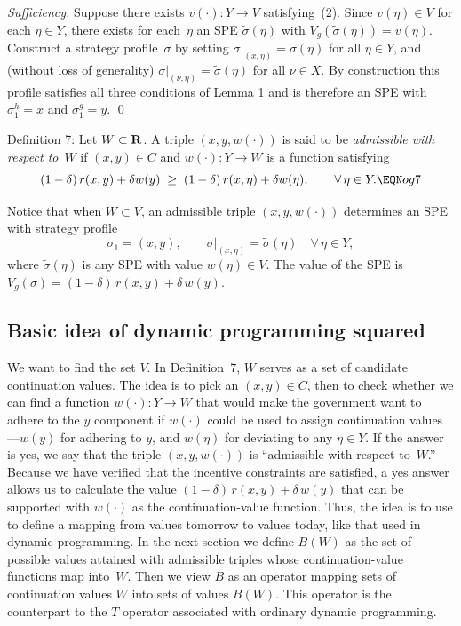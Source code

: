 \smallskip
{\sl Sufficiency.\/}
Suppose there exists $v(\cdot):Y\to V$ satisfying~(2).
Since $v(\eta)\in V$ for each $\eta\in Y$, there exists for each~$\eta$
an SPE $\tilde\sigma(\eta)$ with $V_g(\tilde\sigma(\eta))=v(\eta)$.
Construct a strategy profile~$\sigma$ by setting
$\sigma|_{(x,\eta)}=\tilde\sigma(\eta)$ for all $\eta\in Y$, and
(without loss of generality) $\sigma|_{(\nu,\eta)}=\tilde\sigma(\eta)$
for all $\nu\in X$.  By construction this profile satisfies all three
conditions of  Lemma 1 and is therefore an SPE with
$\sigma^h_1=x$ and $\sigma^g_1=y$.
\qed






\medskip\noindent
{\sc Definition 7:} 
Let $W\subset{\bf R}$.  A triple $(x,y,w(\cdot))$ is said to be
{\it admissible with respect to\/}~$W$ if $(x,y)\in C$ and
$w(\cdot):Y\to W$ is a function satisfying
$$  (1-\delta)\,r(x,y)+\delta w(y)
    \;\geq\;
    (1-\delta)\,r(x,\eta)+\delta w(\eta) ,
    \qquad \forall\,\eta\in Y . \EQN og7 $$


\medskip %
Notice that when $W\subset V$, an admissible triple $(x,y,w(\cdot))$
determines an SPE with strategy profile
$$\sigma_1=(x,y),\qquad \sigma|_{(x,\eta)}=\tilde\sigma(\eta)
  \quad\forall\,\eta\in Y,$$
where $\tilde\sigma(\eta)$ is any SPE with value $w(\eta)\in V$.
The value of the SPE is
$V_g(\sigma)=(1-\delta)\,r(x,y)+\delta\,w(y)$.



\medskip
\subsection{Basic idea of dynamic programming squared}
We want to find the set $V$. In Definition~7, $W$ serves as a
set of candidate continuation values. The idea is to pick an $(x,y)\in
C$, then to check whether we can find a function $w(\cdot):Y\to W$ that
would make the government want to adhere to the $y$ component if
$w(\cdot)$ could be used to assign continuation values---$w(y)$ for
adhering to $y$, and $w(\eta)$ for deviating to any $\eta\in Y$. If the
answer is yes, we say that the triple $(x,y,w(\cdot))$ is ``admissible
with respect to~$W$.'' Because we have verified that the incentive
constraints are satisfied, a yes answer allows us to calculate the value
$
  (1-\delta)\,r(x,y)+\delta\,w(y)
$
that can be supported with $w(\cdot)$ as the continuation-value
function. Thus, the idea is to use   to define a mapping
from values tomorrow to values today, like that used in dynamic
programming. In the next section we define $B(W)$ as the set of possible
values attained with admissible triples whose continuation-value
functions map into~$W$. Then we view $B$ as an operator mapping sets of
continuation values $W$ into sets of values $B(W)$. This operator is the
counterpart to the $T$ operator associated with ordinary dynamic
programming.

